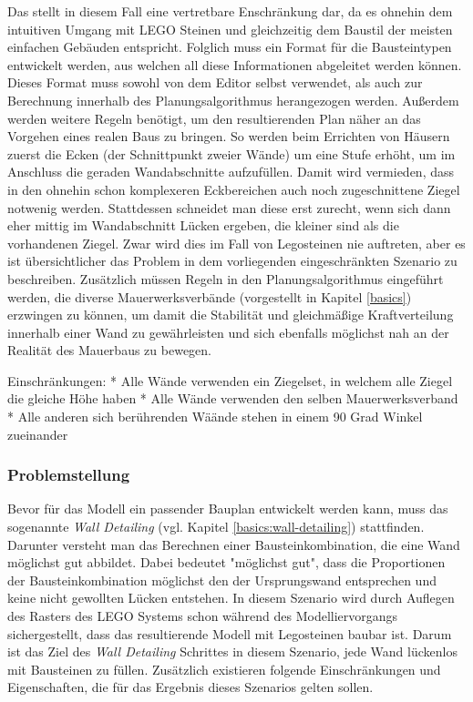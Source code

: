 Das stellt in diesem Fall eine vertretbare Enschränkung dar, da es ohnehin dem intuitiven Umgang mit LEGO Steinen und gleichzeitig dem Baustil der meisten einfachen Gebäuden entspricht.
Folglich muss ein Format für die Bausteintypen entwickelt werden, aus welchen all diese Informationen abgeleitet werden können.
Dieses Format muss sowohl von dem Editor selbst verwendet, als auch zur Berechnung innerhalb des Planungsalgorithmus herangezogen werden.
Außerdem werden weitere Regeln benötigt, um den resultierenden Plan näher an das Vorgehen eines realen Baus zu bringen.
So werden beim Errichten von Häusern zuerst die Ecken (der Schnittpunkt zweier Wände) um eine Stufe erhöht, um im Anschluss die geraden Wandabschnitte aufzufüllen.
Damit wird vermieden, dass in den ohnehin schon komplexeren Eckbereichen auch noch zugeschnittene Ziegel notwenig werden.
Stattdessen schneidet man diese erst zurecht, wenn sich dann eher mittig im Wandabschnitt Lücken ergeben, die kleiner sind als die vorhandenen Ziegel.
Zwar wird dies im Fall von Legosteinen nie auftreten, aber es ist übersichtlicher das Problem in dem vorliegenden eingeschränkten Szenario zu beschreiben.
Zusätzlich müssen Regeln in den Planungsalgorithmus eingeführt werden, die diverse Mauerwerksverbände (vorgestellt in Kapitel \ref{basics}) erzwingen zu können, um damit die Stabilität und gleichmäßige Kraftverteilung innerhalb einer Wand zu gewährleisten und sich ebenfalls möglichst nah an der Realität des Mauerbaus zu bewegen.

Einschränkungen:
 * Alle Wände verwenden ein Ziegelset, in welchem alle Ziegel die gleiche Höhe haben
 * Alle Wände verwenden den selben Mauerwerksverband
 * Alle anderen sich berührenden Wäände stehen in einem 90 Grad Winkel zueinander

\subsubsection{Problemstellung}
\label{scenarios:scenario1:problem}
Bevor für das Modell ein passender Bauplan entwickelt werden kann, muss das sogenannte \textit{Wall Detailing} (vgl. Kapitel \ref{basics:wall-detailing}) stattfinden.
Darunter versteht man das Berechnen einer Bausteinkombination, die eine Wand möglichst gut abbildet.
Dabei bedeutet "möglichst gut", dass die Proportionen der Bausteinkombination möglichst den der Ursprungswand entsprechen und keine nicht gewollten Lücken entstehen.
In diesem Szenario wird durch Auflegen des Rasters des LEGO Systems schon während des Modelliervorgangs sichergestellt, dass das resultierende Modell mit Legosteinen baubar ist.
Darum ist das Ziel des \textit{Wall Detailing} Schrittes in diesem Szenario, jede Wand lückenlos mit Bausteinen zu füllen.
Zusätzlich existieren folgende Einschränkungen und Eigenschaften, die für das Ergebnis dieses Szenarios gelten sollen.

